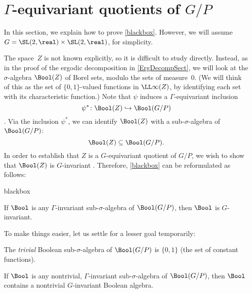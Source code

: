 \section{\texorpdfstring{$\Gamma$}{Γ}-equivariant quotients of \texorpdfstring{$G/P$}{G/P}
	\texorpdfstring{\optional}{(optional)}} \label{QuotG/PPfSect}

In this section, we explain how to prove \cref{blackbox}. However, we will assume $G = \SL(2,\real) \times \SL(2,\real)$, for simplicity.

The space~$Z$ is not known explicitly, so it is difficult to study directly. Instead, as in the proof of the ergodic decomposition in \cref{ErgDecompSect}, we will look at the $\sigma$-algebra $\Bool(Z)$ of Borel sets, modulo the sets of measure~$0$. (We will think of this as the set of $\{0,1\}$-valued functions in $\LL\infty(Z)$, by identifying each set with its characteristic function.)
Note that $\psi$ induces a $\Gamma$-equivariant inclusion
	 $$\psi^* \colon \Bool(Z) \hookrightarrow \Bool(G/P) $$
. 
Via the inclusion $\psi^*$, we can identify $\Bool(Z)$ with a sub-$\sigma$-algebra of $\Bool(G/P)$:
	 $$\Bool(Z) \subseteq \Bool(G/P) .$$
In order to establish that $Z$ is a $G$-equivariant quotient of $G/P$, we wish to show that $\Bool(Z)$ is $G$-invariant . Therefore, \cref{blackbox}  can be reformulated as follows:

\begin{thmrefer}{blackbox}
\begin{thm} \label{blackbox'}
If $\Bool$ is any\/ $\Gamma$-invariant sub-$\sigma$-algebra of $\Bool(G/P)$, then $\Bool$ is $G$-invariant.
\end{thm}
\end{thmrefer}

To make things easier, let us settle for a lesser goal temporarily:

\begin{defn} 
The \emph{trivial} Boolean sub-$\sigma$-algebra of $\Bool(G/P)$ is $\{0,1\}$ (the set of constant functions).
\end{defn}

\begin{prop} \label{lessergoal}
If $\Bool$ is any nontrivial, $\Gamma$-invariant sub-$\sigma$-algebra of $\Bool(G/P)$, then $\Bool$ contains a nontrivial $G$-invariant Boolean algebra.
\end{prop}

